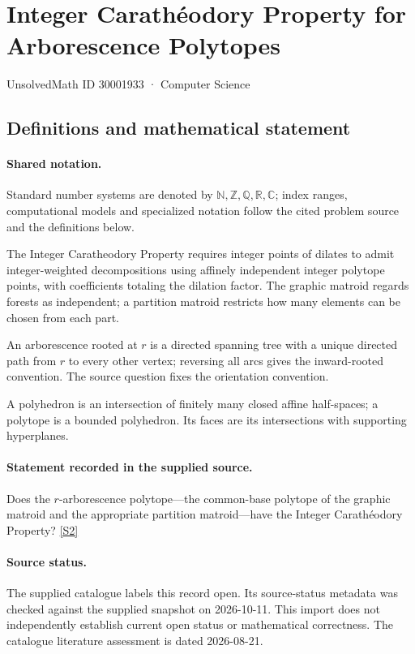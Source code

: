 \documentclass[11pt]{article}
\newcommand{\sref}[2]{\hyperlink{source:#1:#2}{[S#2]}}
\begin{document}
\setcounter{section}{30001932}
\section{Integer Carathéodory Property for Arborescence Polytopes}\label{30001933}
{\small\sffamily UnsolvedMath ID 30001933 · Computer Science}
\subsection{Definitions and mathematical statement}

\paragraph{Shared notation.}Standard number systems are denoted by $\mathbb N,\mathbb Z,\mathbb Q,\mathbb R,\mathbb C$; index ranges, computational models and specialized notation follow the cited problem source and the definitions below.


The Integer Caratheodory Property requires integer points of dilates to admit integer-weighted decompositions using affinely independent integer polytope points, with coefficients totaling the dilation factor. The graphic matroid regards forests as independent; a partition matroid restricts how many elements can be chosen from each part.

An arborescence rooted at $r$ is a directed spanning tree with a unique directed path from $r$ to every other vertex; reversing all arcs gives the inward-rooted convention. The source question fixes the orientation convention.

A polyhedron is an intersection of finitely many closed affine half-spaces; a polytope is a bounded polyhedron. Its faces are its intersections with supporting hyperplanes.
\paragraph{Statement recorded in the supplied source.}
Does the $r$-arborescence polytope—the common-base polytope of the graphic matroid and the appropriate partition matroid—have the Integer Carathéodory Property? \sref{30001933}{2}
\paragraph{Source status.}
The supplied catalogue labels this record open. Its source-status metadata was checked against the supplied snapshot on 2026-10-11. This import does not independently establish current open status or mathematical correctness. The catalogue literature assessment is dated 2026-08-21.
\end{document}
